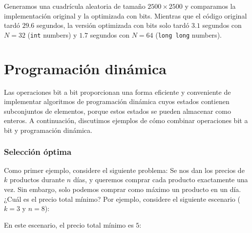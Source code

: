 Generamos una cuadrícula aleatoria de tamaño $2500 \times 2500$
y comparamos la implementación original y la optimizada con bits.
Mientras que el código original tardó $29.6$ segundos,
la versión optimizada con bits solo tardó $3.1$ segundos
con $N=32$ (\texttt{int} numbers) y $1.7$ segundos
con $N=64$ (\texttt{long long} numbers).

\section{Programación dinámica}

Las operaciones bit a bit proporcionan una forma eficiente y conveniente
de implementar algoritmos de programación dinámica
cuyos estados contienen subconjuntos de elementos,
porque estos estados se pueden almacenar como enteros.
A continuación, discutimos ejemplos de cómo combinar
operaciones bit a bit y programación dinámica.

\subsubsection{Selección óptima}

Como primer ejemplo, considere el siguiente problema:
Se nos dan los precios de $k$ productos
durante $n$ días, y queremos comprar cada producto
exactamente una vez.
Sin embargo, solo podemos comprar como máximo un producto
en un día.
¿Cuál es el precio total mínimo?
Por ejemplo, considere el siguiente escenario ($k=3$ y $n=8$):
\begin{center}
\end{center}
En este escenario, el precio total mínimo es $5$:
\begin{center}
\end{center}

